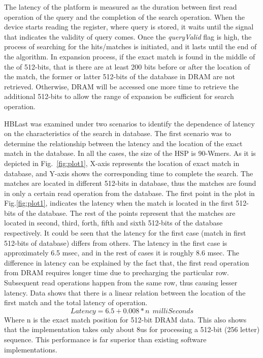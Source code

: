 The latency of the platform is measured as the duration between first read operation of the query and the completion of the search operation. 
When the device starts reading the register, where query is stored, it waits until the signal that indicates the validity of query comes. 
Once the \textit{queryValid} flag is high, the process of searching for the hits/matches is initiated, and it lasts until the end of the algorithm.  
In expansion process, if the exact match is found in the middle of the of 512-bits, that is there are at least 200 bits before or after the location of the match, the former or latter 512-bits of the database in DRAM are not retrieved. 
Otherwise, DRAM will be accessed one more time to retrieve the additional 512-bits to allow the range of expansion be sufficient for search operation. 

HBLast was examined under two scenarios to identify the dependence of latency on the characteristics of the search in database. 
The first scenario was to determine the relationship between the latency and the location of the exact match in the database.
In all the cases, the size of the HSP is 90-Wmers. 
As it is depicted in Fig.~\ref{fig:plot1}, X-axis represents the location of exact match in database, and Y-axis shows the corresponding time to complete the search. 
The matches are located in different 512-bits in database, thus the matches are found in only a certain read operation from the database. 
The first point in the plot in Fig.\ref{fig:plot1}, indicates the latency when the match is located in the first 512-bits of the database. 
The rest of the points represent that the matches are located in second, third, forth, fifth and sixth 512-bits of the database respectively. 
It could be seen that the latency for the first case (match in first 512-bits of database) differs from others. 
The latency in the first case is approximately 6.5 msec, and in the rest of cases it is roughly 8.6 msec. 
The difference in latency can be explained by the fact that, the first read operation from DRAM requires longer time due to precharging the particular row.
Subsequent read operations happen from the same row, thus causing lesser latency.
Data shows that there is a linear relation between the location of the first match and the total latency of operation.\\
\begin{equation}
\label{eq2}
Latency = 6.5 + 0.008*n~~milliSeconds
\end{equation}
Where n is the exact match position for 512-bit DRAM data.
This also shows that the implementation takes only about 8us for processing a 512-bit (256 letter) sequence.
This performance is far superior than existing software implementations.

